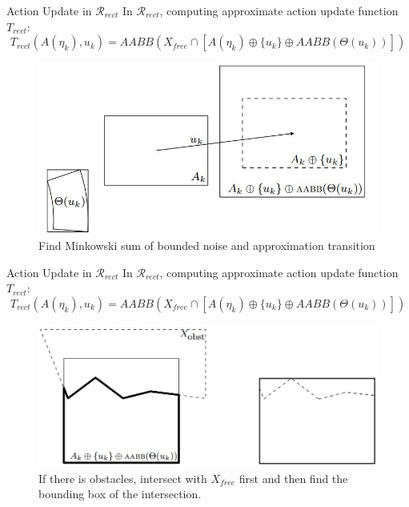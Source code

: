 \begin{frame}{Action Update in $\mathcal{R}_{rect}$}
  In $\mathcal{R}_{rect}$, computing approximate action update function $T_{rect} :$\\
  $$T_{rect}(A(\eta_k), u_k) = AABB(X_{free} \cap [A(\eta_k) \oplus \{ u_k \} \oplus AABB(\Theta(u_k))])$$
  \begin{figure}
    \includegraphics[scale=0.35]{figs/step12.jpg}
    \caption{Find Minkowski sum of bounded noise and approximation transition}
  \end{figure}
\end{frame}


\begin{frame}{Action Update in $\mathcal{R}_{rect}$}
  In $\mathcal{R}_{rect}$, computing approximate action update function $T_{rect} :$\\
  $$T_{rect}(A(\eta_k), u_k) = AABB(X_{free} \cap [A(\eta_k) \oplus \{ u_k \} \oplus AABB(\Theta(u_k))])$$
  \begin{figure}
    \includegraphics[scale=0.35]{figs/step34.jpg}
    \caption{If there is obstacles, intersect with $X_{free}$ first and
      then find the bounding box of the intersection.}
  \end{figure} 
\end{frame}

